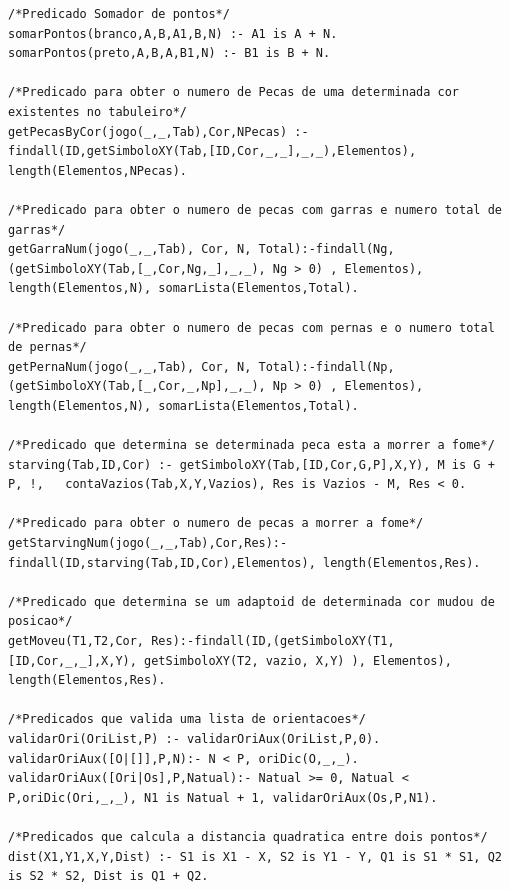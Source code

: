 \documentclass[a4paper]{article}
\begin{document}
\begin{lstlisting}
/*Predicado Somador de pontos*/
somarPontos(branco,A,B,A1,B,N) :- A1 is A + N.
somarPontos(preto,A,B,A,B1,N) :- B1 is B + N.

/*Predicado para obter o numero de Pecas de uma determinada cor existentes no tabuleiro*/
getPecasByCor(jogo(_,_,Tab),Cor,NPecas) :-  findall(ID,getSimboloXY(Tab,[ID,Cor,_,_],_,_),Elementos), length(Elementos,NPecas).

/*Predicado para obter o numero de pecas com garras e numero total de garras*/
getGarraNum(jogo(_,_,Tab), Cor, N, Total):-findall(Ng, (getSimboloXY(Tab,[_,Cor,Ng,_],_,_), Ng > 0) , Elementos), length(Elementos,N), somarLista(Elementos,Total).

/*Predicado para obter o numero de pecas com pernas e o numero total de pernas*/
getPernaNum(jogo(_,_,Tab), Cor, N, Total):-findall(Np, (getSimboloXY(Tab,[_,Cor,_,Np],_,_), Np > 0) , Elementos), length(Elementos,N), somarLista(Elementos,Total).

/*Predicado que determina se determinada peca esta a morrer a fome*/
starving(Tab,ID,Cor) :- getSimboloXY(Tab,[ID,Cor,G,P],X,Y), M is G + P, !,   contaVazios(Tab,X,Y,Vazios), Res is Vazios - M, Res < 0.

/*Predicado para obter o numero de pecas a morrer a fome*/
getStarvingNum(jogo(_,_,Tab),Cor,Res):- findall(ID,starving(Tab,ID,Cor),Elementos), length(Elementos,Res).

/*Predicado que determina se um adaptoid de determinada cor mudou de posicao*/
getMoveu(T1,T2,Cor, Res):-findall(ID,(getSimboloXY(T1,[ID,Cor,_,_],X,Y), getSimboloXY(T2, vazio, X,Y) ), Elementos), length(Elementos,Res).

/*Predicados que valida uma lista de orientacoes*/
validarOri(OriList,P) :- validarOriAux(OriList,P,0).
validarOriAux([O|[]],P,N):- N < P, oriDic(O,_,_).
validarOriAux([Ori|Os],P,Natual):- Natual >= 0, Natual < P,oriDic(Ori,_,_), N1 is Natual + 1, validarOriAux(Os,P,N1).

/*Predicados que calcula a distancia quadratica entre dois pontos*/
dist(X1,Y1,X,Y,Dist) :- S1 is X1 - X, S2 is Y1 - Y, Q1 is S1 * S1, Q2 is S2 * S2, Dist is Q1 + Q2.
\end{lstlisting}
\end{document}
